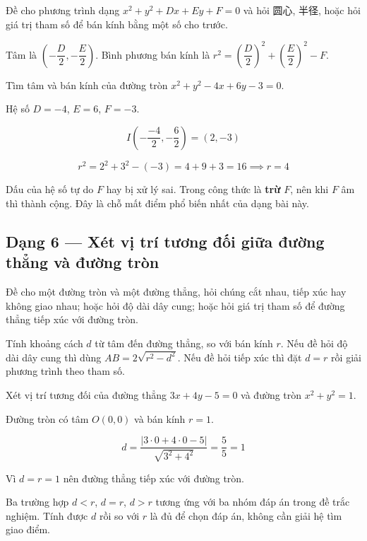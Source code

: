 \documentclass[11pt, a4paper]{article}
\begin{document}
 Đề cho phương trình dạng $x^2 + y^2 + Dx + Ey + F = 0$ và hỏi 圆心, 半径, hoặc hỏi giá trị tham số để bán kính bằng một số cho trước.

 Tâm là $\left(-\dfrac{D}{2}, -\dfrac{E}{2}\right)$. Bình phương bán kính là $r^2 = \left(\dfrac{D}{2}\right)^2 + \left(\dfrac{E}{2}\right)^2 - F$.

\begin{vidu}[{5}]
Tìm tâm và bán kính của đường tròn $x^2 + y^2 - 4x + 6y - 3 = 0$.

Hệ số $D = -4$, $E = 6$, $F = -3$.

$$I\left(-\frac{-4}{2}, -\frac{6}{2}\right) = (2, -3)$$

$$r^2 = 2^2 + 3^2 - (-3) = 4 + 9 + 3 = 16 \implies r = 4$$

 Dấu của hệ số tự do $F$ hay bị xử lý sai. Trong công thức là \textbf{trừ} $F$, nên khi $F$ âm thì thành cộng. Đây là chỗ mất điểm phổ biến nhất của dạng bài này.

\end{vidu}
\subsection{Dạng 6 — Xét vị trí tương đối giữa đường thẳng và đường tròn}

 Đề cho một đường tròn và một đường thẳng, hỏi chúng cắt nhau, tiếp xúc hay không giao nhau; hoặc hỏi độ dài dây cung; hoặc hỏi giá trị tham số để đường thẳng tiếp xúc với đường tròn.

 Tính khoảng cách $d$ từ tâm đến đường thẳng, so với bán kính $r$. Nếu đề hỏi độ dài dây cung thì dùng $AB = 2\sqrt{r^2 - d^2}$. Nếu đề hỏi tiếp xúc thì đặt $d = r$ rồi giải phương trình theo tham số.

\begin{vidu}[{6}]
Xét vị trí tương đối của đường thẳng $3x + 4y - 5 = 0$ và đường tròn $x^2 + y^2 = 1$.

Đường tròn có tâm $O(0,0)$ và bán kính $r = 1$.

$$d = \frac{|3 \cdot 0 + 4 \cdot 0 - 5|}{\sqrt{3^2 + 4^2}} = \frac{5}{5} = 1$$

Vì $d = r = 1$ nên đường thẳng tiếp xúc với đường tròn.

 Ba trường hợp $d < r$, $d = r$, $d > r$ tương ứng với ba nhóm đáp án trong đề trắc nghiệm. Tính được $d$ rồi so với $r$ là đủ để chọn đáp án, không cần giải hệ tìm giao điểm.

\end{vidu}
\end{document}
